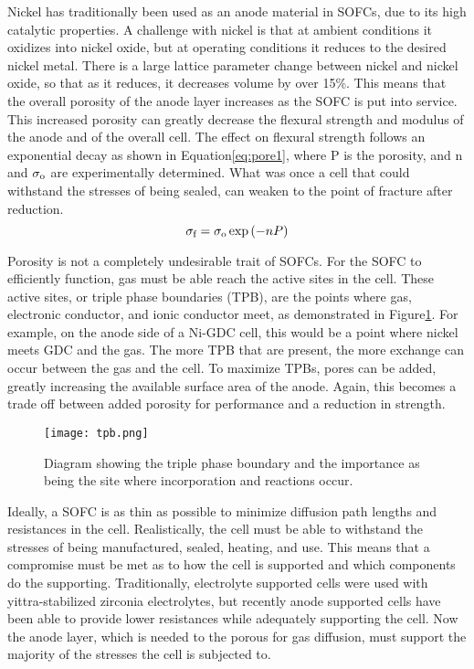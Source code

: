 Nickel has traditionally been used as an anode material in SOFCs, due to its high catalytic properties. %
A challenge with nickel is that at ambient conditions it oxidizes into nickel oxide, but at operating conditions it reduces to the desired nickel metal.
There is a large lattice parameter change between nickel and nickel oxide, so that as it reduces, it decreases volume by over 15\%.
This means that the overall porosity of the anode layer increases as the SOFC is put into service.\cite{Gutierrez-Mora2002,Yu2007}
This increased porosity can greatly decrease the flexural strength and modulus of the anode and of the overall cell.\cite{Callister2014,Barsoum2003}
The effect on flexural strength follows an exponential decay as shown in Equation\ref{eq:pore1}, where P is the porosity, and n and \(\sigma_{\textrm{o}}\) are experimentally determined.
What was once a cell that could withstand the stresses of being sealed, can weaken to the point of fracture after reduction.
\begin{equation} \label{eq:pore1}
\sigma_{\textrm{f}} = \sigma_{\textrm{o}}\exp{(-nP)}
\end{equation}

Porosity is not a completely undesirable trait of SOFCs.
For the SOFC to efficiently function, gas must be able reach the active sites in the cell.
These active sites, or triple phase boundaries (TPB), are the points where gas, electronic conductor, and ionic conductor meet, as demonstrated in Figure\ref{tpb}.
For example, on the anode side of a Ni-GDC cell, this would be a point where nickel meets GDC and the gas.
The more TPB that are present, the more exchange can occur between the gas and the cell.
To maximize TPBs, pores can be added, greatly increasing the available surface area of the anode.
Again, this becomes a trade off between added porosity for performance and a reduction in strength.\cite{Pihlatie2009,Laurencin2010}
\begin{figure}[h]
  \centering
  \texttt{[image: tpb.png]}
  \caption[Diagram showing the triple phase boundary and the importance as being the site where incorporation and reactions occur.]{Diagram showing the triple phase boundary and the importance as being the site where incorporation and reactions occur.\cite{Wachsman2011a}}\label{tpb}
\end{figure}

Ideally, a SOFC is as thin as possible to minimize diffusion path lengths and resistances in the cell.\cite{Chan2001}
Realistically, the cell must be able to withstand the stresses of being manufactured, sealed, heating, and use.
This means that a compromise must be met as to how the cell is supported and which components do the supporting.
Traditionally, electrolyte supported cells were used with yittra-stabilized zirconia electrolytes, but recently anode supported cells have been able to provide lower resistances while adequately supporting the cell.\cite{Fleischhauer2014a,Laurencin2008}
Now the anode layer, which is needed to the porous for gas diffusion, must support the majority of the stresses the cell is subjected to.

